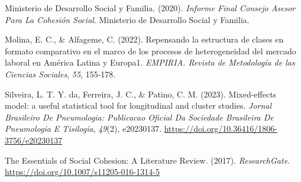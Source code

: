 \documentclass[
  spanish,
  a4paper,
  oneside]{scrbook}
\newlength{\cslhangindent}
\newenvironment{CSLReferences}[2] %
 {\begin{list}{}{%
  \setlength{\itemindent}{0pt}
  \setlength{\leftmargin}{0pt}
  \setlength{\parsep}{0pt}
  \ifodd #1
   \setlength{\leftmargin}{\cslhangindent}
   \setlength{\itemindent}{-1\cslhangindent}
  \fi
  \setlength{\itemsep}{#2\baselineskip}}}
 {\end{list}}
\begin{document}
\begin{CSLReferences}{1}{0}
Ministerio de Desarrollo Social y Familia. (2020). \emph{Informe Final
{Consejo Asesor} Para La {Cohesión Social}}. Ministerio de Desarrollo
Social y Familia.

Molina, E. C., \& Alfageme, C. (2022). {Repensando la estructura de
clases en formato comparativo en el marco de los procesos de
heterogeneidad del mercado laboral en América Latina y Europa1}.
\emph{EMPIRIA. Revista de Metodología de las Ciencias Sociales},
\emph{55}, 155-178.

Silveira, L. T. Y. da, Ferreira, J. C., \& Patino, C. M. (2023).
{Mixed-effects model: a useful statistical tool for longitudinal and
cluster studies}. \emph{Jornal Brasileiro De Pneumologia: Publicacao
Oficial Da Sociedade Brasileira De Pneumologia E Tisilogia},
\emph{49}(2), e20230137.
\url{https://doi.org/10.36416/1806-3756/e20230137}

The {Essentials} of {Social Cohesion}: {A Literature Review}. (2017).
\emph{ResearchGate}. \url{https://doi.org/10.1007/s11205-016-1314-5}

\end{CSLReferences}


\backmatter

\mainmatter
\pagestyle{scrheadings}

\end{document}
